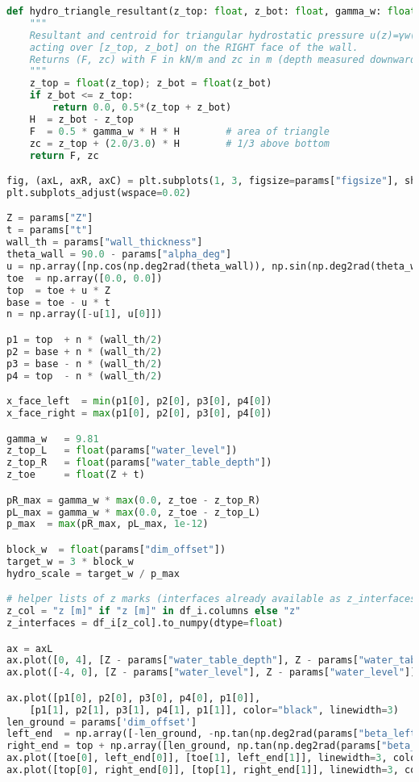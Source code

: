 \begin{lstlisting}[language=Python]
def hydro_triangle_resultant(z_top: float, z_bot: float, gamma_w: float = 9.81):
    """
    Resultant and centroid for triangular hydrostatic pressure u(z)=γw(z - z_top)
    acting over [z_top, z_bot] on the RIGHT face of the wall.
    Returns (F, zc) with F in kN/m and zc in m (depth measured downward).
    """
    z_top = float(z_top); z_bot = float(z_bot)
    if z_bot <= z_top:
        return 0.0, 0.5*(z_top + z_bot)
    H  = z_bot - z_top
    F  = 0.5 * gamma_w * H * H        # area of triangle
    zc = z_top + (2.0/3.0) * H        # 1/3 above bottom
    return F, zc

fig, (axL, axR, axC) = plt.subplots(1, 3, figsize=params["figsize"], sharey=True)
plt.subplots_adjust(wspace=0.02)

Z = params["Z"]
t = params["t"]
wall_th = params["wall_thickness"]
theta_wall = 90.0 - params["alpha_deg"]
u = np.array([np.cos(np.deg2rad(theta_wall)), np.sin(np.deg2rad(theta_wall))])
toe  = np.array([0.0, 0.0])
top  = toe + u * Z
base = toe - u * t
n = np.array([-u[1], u[0]])

p1 = top  + n * (wall_th/2)
p2 = base + n * (wall_th/2)
p3 = base - n * (wall_th/2)
p4 = top  - n * (wall_th/2)

x_face_left  = min(p1[0], p2[0], p3[0], p4[0])
x_face_right = max(p1[0], p2[0], p3[0], p4[0])

gamma_w   = 9.81
z_top_L   = float(params["water_level"])
z_top_R   = float(params["water_table_depth"])
z_toe     = float(Z + t)

pR_max = gamma_w * max(0.0, z_toe - z_top_R)
pL_max = gamma_w * max(0.0, z_toe - z_top_L)
p_max  = max(pR_max, pL_max, 1e-12)

block_w  = float(params["dim_offset"])
target_w = 3 * block_w
hydro_scale = target_w / p_max

# helper lists of z marks (interfaces already available as z_interfaces)
z_col = "z [m]" if "z [m]" in df_i.columns else "z"
z_interfaces = df_i[z_col].to_numpy(dtype=float)

ax = axL
ax.plot([0, 4], [Z - params["water_table_depth"], Z - params["water_table_depth"]], linestyle="--", linewidth=1.0, color="black")
ax.plot([-4, 0], [Z - params["water_level"], Z - params["water_level"]], linestyle="--", linewidth=1.0, color="black")

ax.plot([p1[0], p2[0], p3[0], p4[0], p1[0]],
    [p1[1], p2[1], p3[1], p4[1], p1[1]], color="black", linewidth=3)
len_ground = params['dim_offset']
left_end  = np.array([-len_ground, -np.tan(np.deg2rad(params["beta_left_deg"])) * len_ground])
right_end = top + np.array([len_ground, np.tan(np.deg2rad(params["beta_right_deg"])) * len_ground])
ax.plot([toe[0], left_end[0]], [toe[1], left_end[1]], linewidth=3, color="black")
ax.plot([top[0], right_end[0]], [top[1], right_end[1]], linewidth=3, color="black")


\end{lstlisting}
